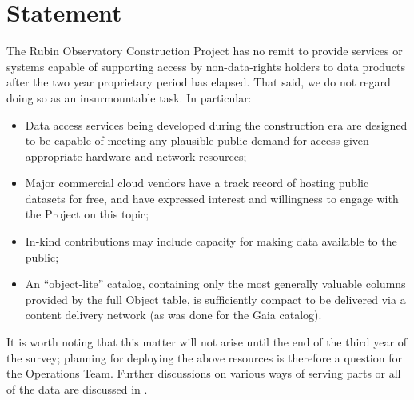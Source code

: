 
\section{Statement}

The Rubin Observatory Construction Project has no remit to provide services or systems capable of supporting access by non-data-rights holders to data products after the two year proprietary period has elapsed.
That said, we do not regard doing so as an insurmountable task.
In particular:

\begin{itemize}

  \item{Data access services being developed during the construction era are designed to be capable of meeting any plausible public demand for access given appropriate hardware and network resources;}
  \item{Major commercial cloud vendors have a track record of hosting public datasets for free, and have expressed interest and willingness to engage with the Project on this topic;}
  \item{In-kind contributions may include capacity for making data available to the public;}
  \item{An ``object-lite'' catalog, containing only the most generally valuable columns provided by the full Object table, is sufficiently compact to be delivered via a content delivery network (as was done for the Gaia catalog).}

\end{itemize}

It is worth noting that this matter will not arise until the end of the third year of the survey; planning for deploying the above resources is therefore a question for the Operations Team.
Further discussions on various ways of serving parts or all of the data are discussed in .
